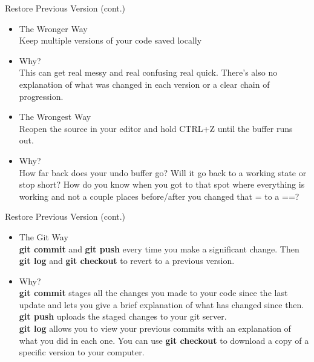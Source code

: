 \documentclass{beamer}
\begin{document}
\begin{frame}{Restore Previous Version (cont.)}
\begin{itemize}
  \item The Wronger Way\\
          Keep multiple versions of your code saved locally
  \pause
  \item Why?\\
        This can get real messy and real confusing real quick. There's also no explanation of what was changed in each version or a clear chain of progression.
  \pause
  \item The Wrongest Way\\
          Reopen the source in your editor and hold CTRL+Z until the buffer runs out.
  \pause
  \item Why?\\
        How far back does your undo buffer go? Will it go back to a working state or stop short? How do you know when you got to that spot where everything is working and not a couple places before/after you changed that = to a ==?
        \end{itemize}
\end{frame}

\begin{frame}{Restore Previous Version (cont.)}
\begin{itemize}
  \item The Git Way\\
        \textbf{git commit} and \textbf{git push} every time you make a significant change. Then \textbf{git log} and \textbf{git checkout} to revert to a previous version.
  \pause
  \item Why?\\
        \textbf{git commit} stages all the changes you made to your code since the last update and lets you give a brief explanation of what has changed since then. \textbf{git push} uploads the staged changes to your git server.\\
        \textbf{git log} allows you to view your previous commits with an explanation of what you did in each one. You can use \textbf{git checkout} to download a copy of a specific version to your computer.
  \end{itemize}
  

\end{frame}
\end{document}
